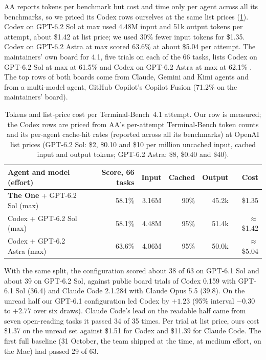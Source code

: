 AA reports tokens per benchmark but cost and time only per agent across
all its benchmarks, so we priced its Codex rows ourselves at the same list prices
(\cref{tab:cost}). Codex on GPT-6.2 Sol at max used 4.48M input and 51k output tokens per attempt,
about \$1.42 at list price; we used 30\% fewer input tokens for \$1.35. Codex on GPT-6.2 Astra at
max scored 63.6\% at about \$5.04 per attempt. The maintainers' own board for 4.1, five trials on
each of the 66 tasks, lists Codex on GPT-6.2 Sol at max at 61.5\% and Codex on GPT-6.2 Astra at max
at 62.1\% \citep{tbench2026board}. The top rows of both boards come from Claude, Gemini and Kimi
agents and from a multi-model agent, GitHub Copilot's Copilot Fusion (71.2\% on the maintainers'
board).

\begin{table}[t]
\centering
\small
\caption{Tokens and list-price cost per Terminal-Bench~4.1 attempt. Our row is measured; the Codex
rows are priced from AA's per-attempt Terminal-Bench token counts and its per-agent cache-hit rates
(reported across all its benchmarks) at OpenAI list prices (GPT-6.2 Sol: \$2, \$0.10 and \$10 per
million uncached input, cached input and output tokens; GPT-6.2 Astra: \$8, \$0.40 and \$40).}
\label{tab:cost}
\begin{tabular}{@{}lrrrrr@{}}
\toprule
Agent and model (effort) & Score, 66 tasks & Input & Cached & Output & Cost \\
\midrule
\textbf{The One} + GPT-6.2 Sol (max) & 58.1\% & 3.16M & 90\% & 45.2k & \$1.35 \\
Codex + GPT-6.2 Sol (max) & 58.1\% & 4.48M & 95\% & 51.4k & $\approx$\$1.42 \\
Codex + GPT-6.2 Astra (max) & 63.6\% & 4.06M & 95\% & 50.0k & $\approx$\$5.04 \\
\bottomrule
\end{tabular}
\end{table}

 With the same split, the configuration scored about 38 of 63
on GPT-6.1 Sol and about 39 on GPT-6.2 Sol, against public board trials of Codex 0.159 with GPT-6.1
Sol (36.4) and Claude Code 2.1.284 with Claude Opus 5.5 (39.8). On the unread half our GPT-6.1
configuration led Codex by $+1.23$ (95\% interval $-0.30$ to $+2.77$ over six draws). Claude Code's
lead on the readable half came from seven open-reading tasks it passed 34 of 35 times. Per trial
at list price, ours cost \$1.37 on the unread set against \$1.51 for Codex and \$11.39 for Claude
Code. The first full baseline (31 October, the team shipped at the time, at medium effort, on the
Mac) had passed 29 of 63.

